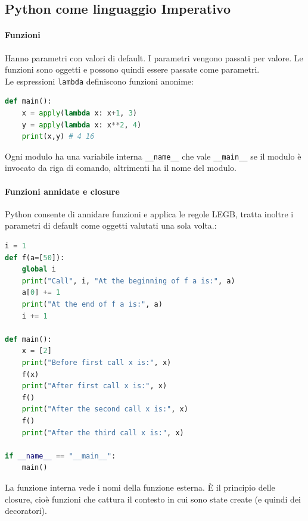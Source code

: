 \documentclass[12pt]{extarticle}
\begin{document}
\subsection{Python come linguaggio Imperativo}
\paragraph{Funzioni} Hanno parametri con valori di default. I parametri vengono passati per valore. Le funzioni sono oggetti e possono quindi essere passate come parametri.\\

\noindent Le espressioni \texttt{lambda} definiscono funzioni anonime:
\begin{lstlisting}[language=Python]
def main():
    x = apply(lambda x: x+1, 3)
    y = apply(lambda x: x**2, 4)
    print(x,y) # 4 16
\end{lstlisting}

\noindent Ogni modulo ha una variabile interna \texttt{\_\_name\_\_} che vale \texttt{\_\_main\_\_} se il modulo è invocato da riga di comando, altrimenti ha il nome del modulo.

\paragraph{Funzioni annidate e closure} Python consente di annidare funzioni e applica le regole LEGB, tratta inoltre i parametri di default come oggetti valutati una sola volta.:
\begin{lstlisting}[language=Python]
i = 1
def f(a=[50]):
    global i
    print("Call", i, "At the beginning of f a is:", a)
    a[0] += 1
    print("At the end of f a is:", a)
    i += 1

def main():
    x = [2]
    print("Before first call x is:", x)
    f(x)
    print("After first call x is:", x)
    f()
    print("After the second call x is:", x)
    f()
    print("After the third call x is:", x)

if __name__ == "__main__":
    main()
\end{lstlisting}

\noindent La funzione interna vede i nomi della funzione esterna. È il principio delle closure, cioè funzioni che cattura il contesto in cui sono state create (e quindi dei decoratori).\\
\end{document}
